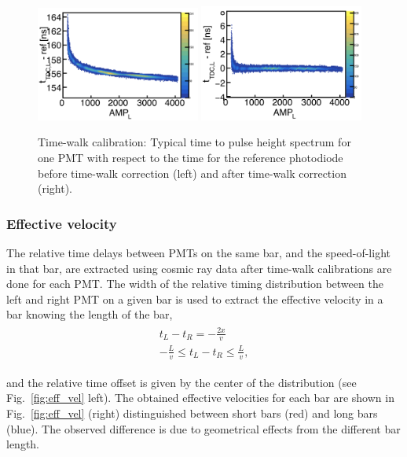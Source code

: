 \documentclass[3p,final,twocolumn]{elsarticle}
\begin{document}
\begin{figure}[tbh]
	\centering
		\includegraphics[width=0.48\textwidth]{tw_before.png}
		\includegraphics[width=0.48\textwidth]{tw_after.png}
	\caption{Time-walk calibration: Typical time to pulse height spectrum for one PMT with respect to the time for the reference photodiode before time-walk correction (left) and after time-walk correction (right).}
	\label{fig:time_walk}
\end{figure}

\subsubsection{Effective velocity}
The relative time delays between PMTs on the same bar, and the speed-of-light in that bar, are extracted using cosmic ray 
data after time-walk calibrations are done for each PMT. The width of the relative timing distribution between the left and 
right PMT on a given bar is used to extract the effective velocity in a bar knowing the length of the bar,
\begin{eqnarray}
	\begin{split}
		t_L - t_R 	= -\frac{2x}{v}							\\
		 -\frac{L}{v}	\leq 	t_L - t_R 	\leq \frac{L}{v},				
		 \label{eqn:eff_vel}
	\end{split}
\end{eqnarray}

and the relative time offset is given by the center of the distribution (see Fig.~\ref{fig:eff_vel} left). The obtained effective velocities for each bar are shown in Fig.~\ref{fig:eff_vel} (right) distinguished between short bars (red) and long bars (blue). The observed difference is due to geometrical effects from the different bar length.
\end{document}
